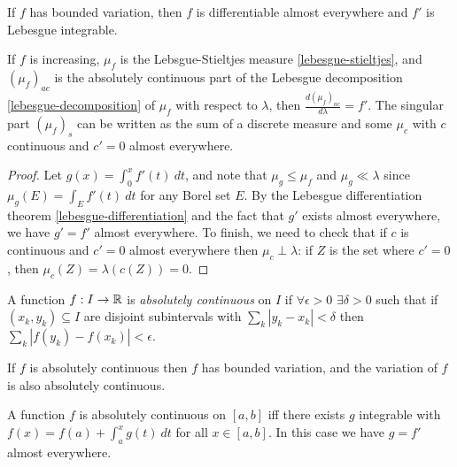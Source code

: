 \begin{cor} If $f$ has bounded variation, then $f$ is differentiable almost everywhere and $f'$ is Lebesgue integrable.
\end{cor}

\begin{cor} If $f$ is increasing, $\mu_f$ is the Lebsgue-Stieltjes measure \ref{lebesgue-stieltjes}, and $(\mu_f)_{ac}$ is the absolutely continuous part of the Lebesgue decomposition \ref{lebesgue-decomposition} of $\mu_f$ with respect to $\lambda$, then $\frac{d(\mu_f)_{ac}}{d\lambda} = f'$. The singular part $(\mu_f)_s$ can be written as the sum of a discrete measure and some $\mu_c$ with $c$ continuous and $c' = 0$ almost everywhere.
\end{cor}
\begin{proof} Let $g(x) = \int_0^x f'(t)\ dt$, and note that $\mu_g \le \mu_f$ and $\mu_g \ll \lambda$ since $\mu_g(E) = \int_E f'(t)\ dt$ for any Borel set $E$. By the Lebesgue differentiation theorem \ref{lebesgue-differentiation} and the fact that $g'$ exists almost everywhere, we have $g' = f'$ almost everywhere. To finish, we need to check that if $c$ is continuous and $c' = 0$ almost everywhere then $\mu_c \perp \lambda$: if $Z$ is the set where $c' = 0$, then $\mu_c(Z) = \lambda(c(Z)) = 0$.
\end{proof}

\begin{defn} A function $f : I \rightarrow \mathbb{R}$ is \emph{absolutely continuous} on $I$ if $\forall \epsilon > 0$ $\exists \delta > 0$ such that if $(x_k,y_k) \subseteq I$ are disjoint subintervals with $\sum_k |y_k - x_k| < \delta$ then $\sum_k |f(y_k) - f(x_k)| < \epsilon$.
\end{defn}

\begin{prop} If $f$ is absolutely continuous then $f$ has bounded variation, and the variation of $f$ is also absolutely continuous.
\end{prop}

\begin{thm}\label{fundamental-lebesgue-integral} A function $f$ is absolutely continuous on $[a,b]$ iff there exists $g$ integrable with $f(x) = f(a) + \int_a^x g(t)\ dt$ for all $x \in [a,b]$. In this case we have $g = f'$ almost everywhere.
\end{thm}

